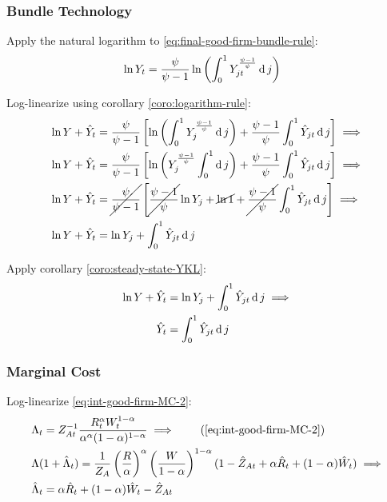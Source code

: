 \documentclass[
thesis.tex
]{subfiles}
\begin{document}
	
	\subsubsection*{Bundle Technology}
	
	Apply the natural logarithm to \ref{eq:final-good-firm-bundle-rule}:
	\begin{align}
		\ln Y_t &= \frac{\psi}{\psi-1} \ln \left( \int_{0}^{1} Y_{jt}^{\frac{\psi-1}{\psi}} \operatorname{d} j \right) \nonumber
	\end{align}
	
	Log-linearize using corollary \ref{coro:logarithm-rule}:
	\begin{align}
		\ln Y + \hat{Y}_t &= \frac{\psi}{\psi-1} \left[ \ln \left( \int_{0}^{1} Y_{j}^{\frac{\psi-1}{\psi}} \operatorname{d} j \right) + \frac{\psi-1}{\psi} \int_{0}^{1} \hat{Y}_{jt} \operatorname{d} j \right] \implies \nonumber
		\\
		\ln Y + \hat{Y}_t &= \frac{\psi}{\psi-1} \left[ \ln \left( Y_{j}^{\frac{\psi-1}{\psi}} \int_{0}^{1} \operatorname{d} j \right) + \frac{\psi-1}{\psi} \int_{0}^{1} \hat{Y}_{jt} \operatorname{d} j \right] \implies \nonumber
		\\
		\ln Y + \hat{Y}_t &= \cancel{\frac{\psi}{\psi-1}} \left[ \cancel{\frac{\psi-1}{\psi}} \ln Y_{j} + \cancel{\ln1} + \cancel{\frac{\psi-1}{\psi}} \int_{0}^{1} \hat{Y}_{jt} \operatorname{d} j \right] \implies \nonumber
		\\
		\ln Y + \hat{Y}_t &= \ln Y_{j} + \int_{0}^{1} \hat{Y}_{jt} \operatorname{d} j \nonumber
	\end{align}
	
	Apply corollary \ref{coro:steady-state-YKL}:
	\begin{align}
		\ln Y + \hat{Y}_t &= \ln Y_{j} + \int_{0}^{1} \hat{Y}_{jt} \operatorname{d} j \implies \nonumber \\
		\hat{Y}_t &= \int_{0}^{1} \hat{Y}_{jt} \operatorname{d} j 
		\label{eq:ll-final-good-firm-bundle-rule}
	\end{align}
	
	
	\subsubsection*{Marginal Cost}
	
	Log-linearize \ref{eq:int-good-firm-MC-2}:
	\begin{alignat}{2}
		& \Lambda_t = Z_{At}^{-1} \frac{R_t^{\alpha} W_t^{1-\alpha} }{ \alpha^{\alpha} (1-\alpha)^{1-\alpha} } \implies \tag{\ref{eq:int-good-firm-MC-2}} \\
		& \Lambda (1+ \hat{\Lambda}_t) = \frac{1}{Z_{A}} \left( \frac{R}{\alpha} \right)^{\alpha} \left( \frac{W}{1-\alpha} \right)^{1-\alpha} (1- \hat{Z}_{At} + \alpha \hat{R}_t + (1- \alpha) \hat{W}_t ) \implies \nonumber \\
		& \hat{\Lambda}_t = \alpha \hat{R}_t + (1- \alpha) \hat{W}_t - \hat{Z}_{At} \label{eq:ll-int-good-firm-MC-2}
	\end{alignat}
	
\end{document}
